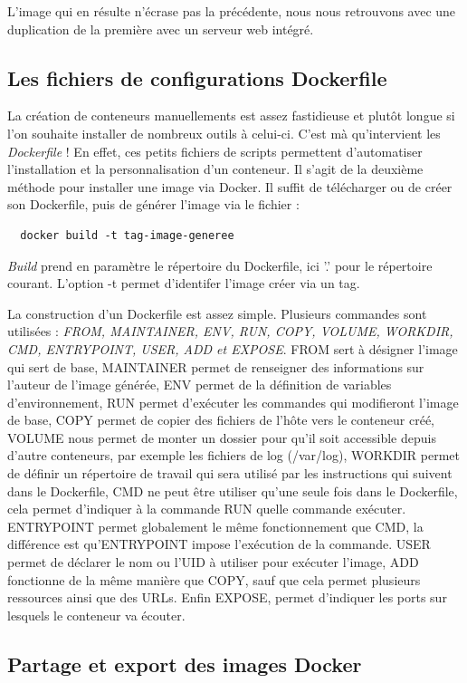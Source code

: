 \documentclass[12pt,a4paper]{article}
\begin{document}
L'image qui en résulte n'écrase pas la précédente, nous nous retrouvons avec une duplication de la première avec un serveur web intégré.

\subsection{Les fichiers de configurations Dockerfile}

La création de conteneurs manuellements est assez fastidieuse et plutôt longue si l'on souhaite installer de nombreux outils à celui-ci. C'est mà qu'intervient les \textit{Dockerfile} ! En effet, ces petits fichiers de scripts permettent d'automatiser l'installation et la personnalisation d'un conteneur. Il s'agit de la deuxième méthode pour installer une image via Docker. Il suffit de télécharger ou de créer son Dockerfile, puis de générer l'image via le fichier :
\begin{lstlisting}
  docker build -t tag-image-generee
\end{lstlisting}
\textit{Build} prend en paramètre le répertoire du Dockerfile, ici '.' pour le répertoire courant. L'option -t permet d'identifer l'image créer via un tag.

La construction d'un Dockerfile est assez simple. Plusieurs commandes sont utilisées : \textit{FROM, MAINTAINER, ENV, RUN, COPY, VOLUME, WORKDIR, CMD, ENTRYPOINT, USER, ADD et EXPOSE}. FROM sert à désigner l'image qui sert de base, MAINTAINER permet de renseigner des informations sur l'auteur de l'image générée, ENV permet de la définition de variables d'environnement, RUN permet d'exécuter les commandes qui modifieront l'image de base, COPY permet de copier des fichiers de l'hôte vers le conteneur créé, VOLUME nous permet de monter un dossier pour qu'il soit accessible depuis d'autre conteneurs, par exemple les fichiers de log (/var/log), WORKDIR permet de définir un répertoire de travail qui sera utilisé par les instructions qui suivent dans le Dockerfile, CMD ne peut être utiliser qu'une seule fois dans le Dockerfile, cela permet d'indiquer à la commande RUN quelle commande exécuter. ENTRYPOINT permet globalement le même fonctionnement que CMD, la différence est qu'ENTRYPOINT impose l'exécution de la commande. USER permet de déclarer le nom ou l'UID à utiliser pour exécuter l'image, ADD fonctionne de la même manière que COPY, sauf que cela permet plusieurs ressources ainsi que des URLs. Enfin EXPOSE, permet d'indiquer les ports sur lesquels le conteneur va écouter. 

\subsection{Partage et export des images Docker}
\end{document}
